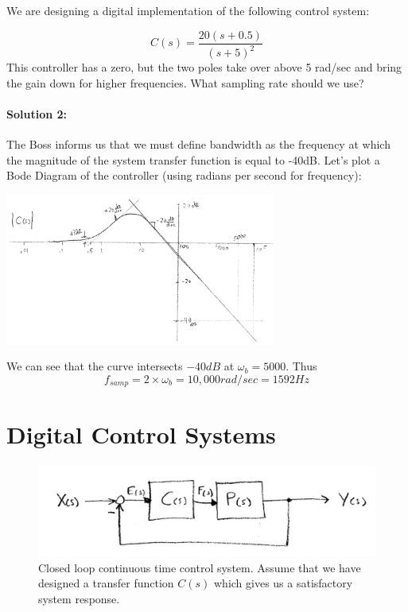 \begin{ExampleSmall}
We are designing a digital implementation of the following control system:

\[
C(s) = \frac  {20(s+0.5)}  {(s+5)^2}
\]
This controller has a zero, but the two poles take over above 5 rad/sec and bring the gain down for higher frequencies.  What sampling rate should we use?

\paragraph{Solution 2:}   The Boss informs us that we must define bandwidth as the frequency at which the magnitude of the system transfer function
is equal to -40dB.  Let's plot a Bode Diagram of the controller (using radians per second for frequency):

\includegraphics[width=3.5in]{figs11/01118.png}

We can see that the curve intersects $-40dB$ at $\omega_b=5000$.   Thus
\[
f_{samp} = 2\times\omega_b =  10,000 rad/sec = 1592 Hz
\]
\end{ExampleSmall}


\section{Digital Control Systems}


\begin{figure}\centering
\includegraphics[width=5.0in]{figs11/ct_cl_sysa.png}
\caption{Closed loop continuous time control system.  Assume that we have designed a transfer function $C(s)$ which gives us a satisfactory system response.}\label{F:ct_cl}
\end{figure}

